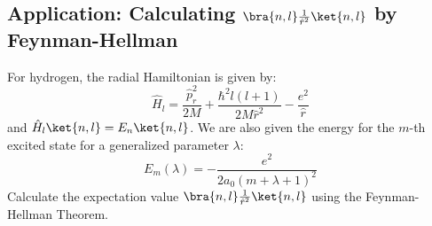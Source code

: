 \hr
\subsection{Application: Calculating $\bra{n, l}\frac{1}{\hat
r^2}\ket{n, l}$ by Feynman-Hellman}

\begin{problem}
    For hydrogen, the radial Hamiltonian is given by:
    \begin{equation} \label{eq:hydrogen_H_l}
        \hat H_l = \frac{\hat p_r^2}{2M} + \frac{\hbar^2
        l(l+1)}{2M\hat r^2} - \frac{e^2}{\hat r}
    \end{equation}
    and $\hat H_l \ket{n,l} = E_n \ket{n, l}$. We are also given the
    energy for the $m$-th excited state for a generalized parameter $\lambda$:
    \begin{equation} \label{eq:hydrogen_E_m_lambda}
        E_m(\lambda) = -\frac{e^2}{2a_0(m+\lambda+1)^2}
    \end{equation}
    Calculate the expectation value $\bra{n, l}\frac{1}{\hat
    r^2}\ket{n, l}$ using the Feynman-Hellman Theorem.
\end{problem}

